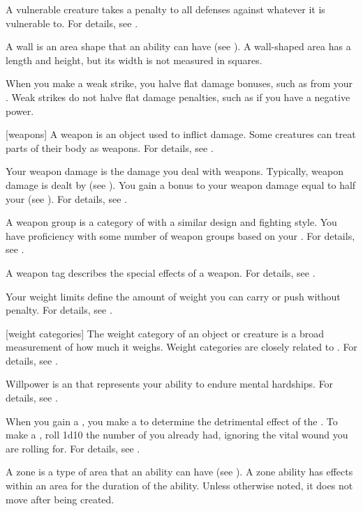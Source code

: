  A vulnerable creature takes a  penalty to all defenses against whatever it is vulnerable to.
For details, see .

 A wall is an area shape that an ability can have (see ).
A wall-shaped area has a length and height, but its width is not measured in squares.

 When you make a weak strike, you halve flat damage bonuses, such as from your .
Weak strikes do not halve flat damage penalties, such as if you have a negative power.

[weapons] A weapon is an object used to inflict damage.
Some creatures can treat parts of their body as weapons.
For details, see .

 Your weapon damage is the damage you deal with weapons.
Typically, weapon damage is dealt by  (see ).
You gain a bonus to your weapon damage equal to half your  (see ).
For details, see .

 A weapon group is a category of  with a similar design and fighting style.
You have proficiency with some number of weapon groups based on your .
For details, see .

 A weapon tag describes the special effects of a weapon.
For details, see .

 Your weight limits define the amount of weight you can carry or push without penalty.
For details, see .

[weight categories] The weight category of an object or creature is a broad measurement of how much it weighs.
Weight categories are closely related to .
For details, see .

 Willpower is an  that represents your ability to endure mental hardships.
For details, see .

 When you gain a , you make a  to determine the detrimental effect of the .
To make a , roll 1d10 \sub the number of  you already had, ignoring the vital wound you are rolling for.
For details, see .

 A zone is a type of area that an ability can have (see ).
A zone ability has effects within an area for the duration of the ability.
Unless otherwise noted, it does not move after being created.
